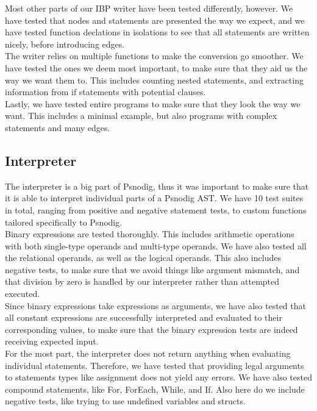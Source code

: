 Most other parts of our IBP writer have been tested differently, however. We have tested that nodes and statements are presented the way we expect, and we have tested function declations in isolations to see that all statements are written nicely, before introducing edges. \\

The writer relies on multiple functions to make the conversion go smoother. We have tested the ones we deem most important, to make sure that they aid us the way we want them to. This includes counting nested statements, and extracting information from if statements with potential clauses. \\

Lastly, we have tested entire programs to make sure that they look the way we want. This includes a minimal example, but also programs with complex statements and many edges.

\subsection{Interpreter}

The interpreter is a big part of Psnodig, thus it was important to make sure that it is able to interpret individual parts of a Psnodig AST. We have 10 test suites in total, ranging from positive and negative statement tests, to custom functions tailored specifically to Psnodig. \\

Binary expressions are tested thoroughly. This includes arithmetic operations with both single-type operands and multi-type operands. We have also tested all the relational operands, as well as the logical operands. This also includes negative tests, to make sure that we avoid things like argument mismatch, and that division by zero is handled by our interpreter rather than attempted executed. \\

Since binary expressions take expressions as arguments, we have also tested that all constant expressions are successfully interpreted and evaluated to their corresponding values, to make sure that the binary expression tests are indeed receiving expected input. \\

For the most part, the interpreter does not return anything when evaluating individual statements. Therefore, we have tested that providing legal arguments to statements types like assignment does not yield any errors. We have also tested compound statements, like For, ForEach, While, and If. Also here do we include negative tests, like trying to use undefined variables and structs. \\

